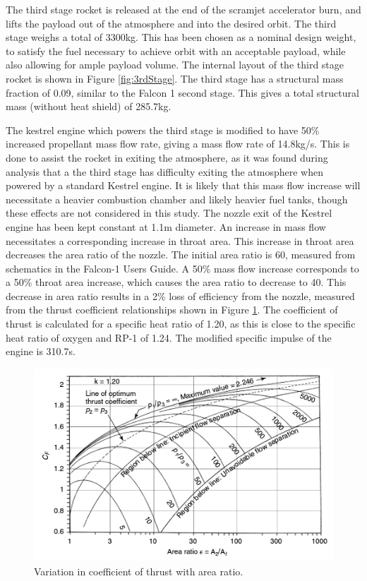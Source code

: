 	The third stage rocket is released at the end of the scramjet accelerator burn, and lifts the payload out of the atmosphere and into the desired orbit. The third stage weighs a total of 3300kg. This has been chosen as a nominal design weight, to satisfy the fuel necessary to achieve orbit with an acceptable payload, while also allowing for ample payload volume. The internal layout of the third stage rocket is shown in Figure \ref{fig:3rdStage}. The third stage has a structural mass fraction of 0.09, similar to the Falcon 1 second stage\cite{Vehicle2008}. This gives a total structural mass (without heat shield) of 285.7kg. 
	
	

	
The kestrel engine which powers the third stage is modified to have 50\% increased propellant mass flow rate, giving a mass flow rate of 14.8kg/s. This is done to assist the rocket in exiting the atmosphere, as it was found during analysis that a the third stage has difficulty exiting the atmosphere when powered by a standard Kestrel engine. It is likely that this mass flow increase will necessitate a heavier combustion chamber and likely heavier fuel tanks, though these effects are not considered in this study. The nozzle exit of the Kestrel engine has been kept constant at 1.1m diameter. An increase in mass flow necessitates a corresponding increase in throat area. This increase in throat area decreases the area ratio of the nozzle. The initial area ratio is 60, measured from schematics in the Falcon-1 Users Guide. A 50\% mass flow increase corresponds to a 50\% throat area increase, which causes the area ratio to decrease to 40. This decrease in area ratio results in a 2\% loss of efficiency from the nozzle, measured from the thrust coefficient relationships shown in Figure \ref{fig:ThrustCoefficient-Arat}\cite{RPE}. The coefficient of thrust is calculated for a specific heat ratio of 1.20, as this is close to the specific heat ratio of oxygen and RP-1 of 1.24\cite{RPE}. The modified specific impulse of the engine is 310.7s.



	
	
	\begin{figure}[ht]
\centering
\includegraphics[width=0.7\linewidth]{"figures/3_vehicle_design/Thrust Coefficient - Arat"}
\caption{Variation in coefficient of thrust with area ratio\cite{RPE}.}
\label{fig:ThrustCoefficient-Arat}
\end{figure}



